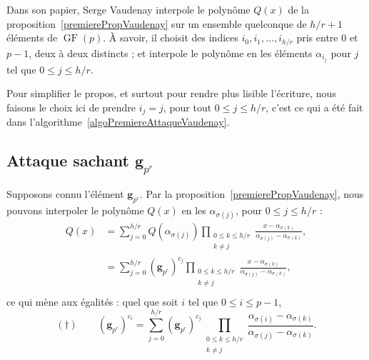 \documentclass[a4paper, titlepage, 11pt]{article}
\theoremstyle{definition}
\theoremstyle{remark}
\def\gf{\operatorname{GF}}
\def\mbf#1{\mathbf{#1}}
\begin{document}
Dans son papier, Serge Vaudenay interpole le polynôme $Q(x)$ de la proposition~\ref{premierePropVaudenay} sur un ensemble quelconque de $h/r+1$ éléments de $\gf(p)$. À savoir, il choisit des indices $i_0, i_1, \dots, i_{h/r}$ pris entre $0$ et $p-1$, deux à deux distincts ; et interpole le polynôme en les éléments $\alpha_{i_j}$ pour $j$ tel que $0 \leqslant j \leqslant h/r$. 

Pour simplifier le propos, et surtout pour rendre plus lisible l'écriture, nous faisons le choix ici de prendre $i_j = j$, pour tout $0 \leqslant j \leqslant h/r$, c'est ce qui a été fait dans l'algorithme~\ref{algoPremiereAttaqueVaudenay}.

\subsection{Attaque sachant $\mbf g_{p^r}$}

Supposons connu l'élément $\mbf g_{p^r}$. Par la proposition~\ref{premierePropVaudenay}, nous pouvons interpoler le polynôme $Q(x)$ en les $\alpha_{\sigma(j)}$, pour $0 \leqslant j \leqslant h/r$ :
\begin{align*}
Q(x) &= \sum_{j=0}^{h/r} Q\left(\alpha_{\sigma(j)}\right) \prod_{\substack{0\leqslant k\leqslant h/r \\ k \neq j}}\frac{x-\alpha_{\sigma(k)}}{\alpha_{\sigma(j)}-\alpha_{\sigma(k)}}, \\
&= \sum_{j=0}^{h/r} (\mbf g_{p^r})^{c_{j}} \prod_{\substack{0\leqslant k\leqslant h/r \\ k \neq j}}\frac{x-\alpha_{\sigma(k)}}{\alpha_{\sigma(j)}-\alpha_{\sigma(k)}}, \\
\end{align*} 
ce qui mène aux égalités : quel que soit $i$ tel que $0\leqslant i \leqslant p-1$,
$$(\dagger) \qquad (\mbf g_{p^r})^{c_i} = \sum_{j=0}^{h/r} (\mbf g_{p^r})^{c_{j}}\prod_{\substack{0\leqslant k\leqslant h/r \\ k \neq j}} \frac{\alpha_{\sigma(i)}-\alpha_{\sigma(k)}}{\alpha_{\sigma(j)}-\alpha_{\sigma(k)}}.$$
\end{document}
